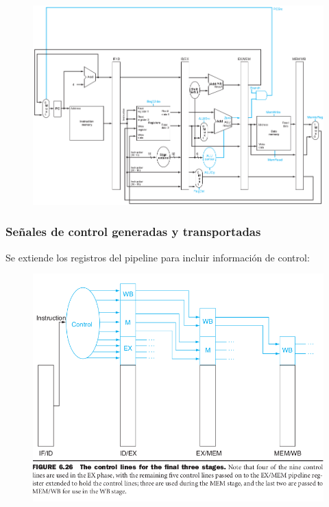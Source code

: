 \documentclass{article}
\begin{document}
\begin{figure}[h!]
    \includegraphics[width=\linewidth]{imagenes/pipeline/pipeline-control.png}
\end{figure}

\newpage
\subsubsection{Señales de control generadas y transportadas }
Se extiende los registros del pipeline para incluir información de control:

\begin{figure}[h!]
    \includegraphics[width=\linewidth]{imagenes/pipeline/pipeline-transporte.png}
\end{figure}
\end{document}

